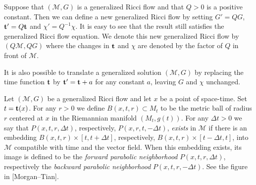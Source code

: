 \begin{definition}\label{def:scaling-translation}

Suppose that $({\mathcal M},G)$ is a generalized Ricci flow and that
$Q>0$ is a positive constant. Then we can define a new generalized
Ricci flow by setting $G'=QG$, ${\bf t'}=Q{\bf t}$ and
$\chi'=Q^{-1}\chi$. It is easy to see that the result still
satisfies the generalized Ricci flow equation. We denote this new
generalized Ricci flow by $(Q{\mathcal M},QG)$ where the changes in
${\bf t}$ and $\chi$ are denoted by the factor of $Q$ in front of
${\mathcal M}$.

It is also possible to translate a generalized solution $({\mathcal M},G)$ by
replacing the time function ${\bf t}$ by ${\bf t'}={\bf t}+a$ for any constant
$a$, leaving $G$ and $\chi$ unchanged.
\end{definition}




\begin{definition}\label{def:parabolic-neighborhoods}

Let $({\mathcal M},G)$ be a generalized Ricci flow and let $x$ be a
point of space-time. Set $t={\bf t}(x)$. For any  $r>0$ we define
$B(x,t,r)\subset M_t$ to be the metric ball of radius $r$ centered
at $x$ in the Riemannian manifold $(M_t,g(t))$. For any $\Delta t>0$
we say that $P(x,t,r,\Delta t)$,
respectively, $P(x,r,t,-\Delta
t)$, {\em exists} in ${\mathcal M}$ if there is an embedding
$B(x,t,r)\times [t,t+\Delta t]$, respectively, $B(x,t,r)\times
[t-\Delta t,t]$, into ${\mathcal M}$ compatible with time and the
vector field. When this embedding exists, its image is defined to be the {\em
forward parabolic neighborhood}
$P(x,t,r,\Delta t)$, respectively the {\em backward parabolic
neighborhood} $P(x,t,r,-\Delta t)$.
See the figure in [Morgan--Tian].
\end{definition}
